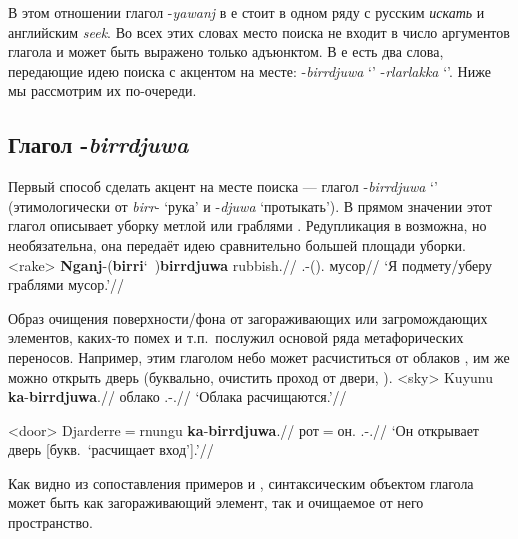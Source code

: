 В этом отношении глагол -\textit{yawanj} в  е стоит в одном ряду с русским \textit{искать} и английским \textit{seek}. Во всех этих словах место поиска не входит в число аргументов глагола и может быть выражено только адъюнктом. В  е есть два слова, передающие идею поиска с акцентом на месте: -\textit{birrdjuwa} `\bdj' -\textit{rlarlakka} `\rlk'. Ниже мы рассмотрим их по-очереди.

\subsection{Глагол -\textit{birrdjuwa}}
\label{sec:bdj}
Первый способ сделать акцент на месте поиска --- глагол -\textit{birrdjuwa} `\bdj' (этимологически от \textit{birr}- `рука' и -\textit{djuwa} `протыкать'). В прямом значении этот глагол описывает уборку метлой или граблями . Редупликация в  возможна, но необязательна, она передаёт идею сравнительно большей площади уборки.
\ex<rake>\begingl
\gla \textbf{Nganj}-(\textbf{birri}\char`~)\textbf{birrdjuwa} rubbish.//
\glb \Fsg.\Fut-(\rdp)\bdj.\Np{} мусор//
\glft `Я подмету/уберу граблями мусор.'//%
\endgl\xe

Образ очищения поверхности/фона от загораживающих или загромождающих элементов, каких-то помех и т.п.\ послужил основой ряда метафорических переносов. Например, этим глаголом небо может расчиститься от облаков , им же можно открыть дверь (буквально, очистить проход от двери, ).
\ex<sky>\begingl
\gla Kuyunu \textbf{ka}-\textbf{birrdjuwa}.//
\glb облако \Tsg.\Real-\bdj.\Np{}//
\glft `Облака расчищаются.'\trailingcitation{[Coleman~2010:16]}//
\endgl\xe

\ex<door>\begingl
\gla Djarderre$=$rnungu \textbf{ka}-\textbf{birrdjuwa}.//
\glb рот$=$он.\Gen{} \Tsg.\Real-\bdj.\Np{}//
\glft `Он открывает дверь [букв.\ `расчищает вход'].'\trailingcitation{[Coleman~2010:17]}//
\endgl\xe

Как видно из сопоставления примеров  и , синтаксическим объектом глагола может быть как загораживающий элемент, так и очищаемое от него пространство.

